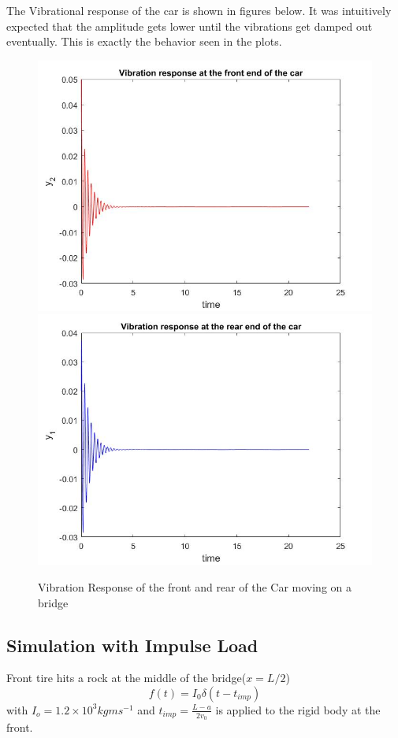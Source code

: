 \documentclass[11pt, oneside]{article}   	%
\begin{document}
The Vibrational response of the car is shown in figures below. It was intuitively expected that the amplitude gets lower until the vibrations get damped out eventually. This is exactly the behavior seen in the plots.
\begin{figure}[!htbp]
	\centering
	\includegraphics[scale=0.3]{CarVibFront}
	\includegraphics[scale=0.3]{CarVibRear}
	\caption{Vibration Response of the front and rear of the Car moving on a bridge}
\end{figure}

\clearpage
\subsection{Simulation with Impulse Load}
Front tire hits a rock at the middle of the bridge($x=L/2$)
\begin{equation}
 f(t) = I_0 \delta(t-t_{imp})
\end{equation}
with $ I_o=1.2 \times 10^3 kgms^{-1}$ and $t_{imp} = \frac{L-a}{2v_0}$ is applied to the rigid body at the front.
\end{document}
